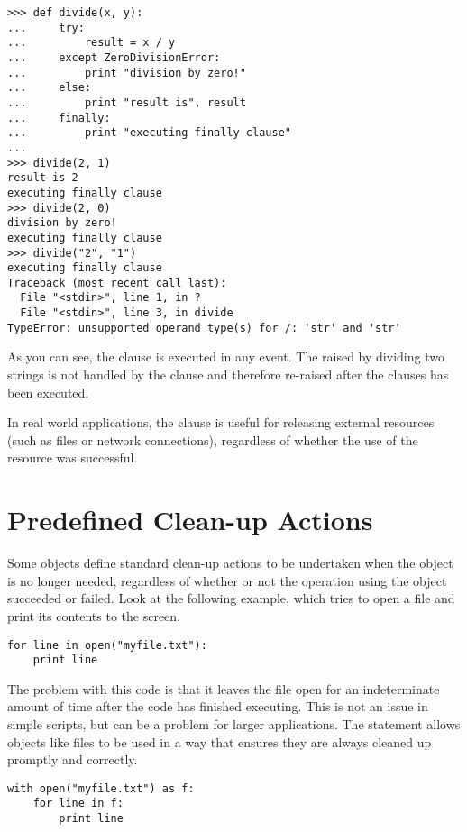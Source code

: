 \documentclass{manual}
\begin{document}
\begin{verbatim}
>>> def divide(x, y):
...     try:
...         result = x / y
...     except ZeroDivisionError:
...         print "division by zero!"
...     else:
...         print "result is", result
...     finally:
...         print "executing finally clause"
...
>>> divide(2, 1)
result is 2
executing finally clause
>>> divide(2, 0)
division by zero!
executing finally clause
>>> divide("2", "1")
executing finally clause
Traceback (most recent call last):
  File "<stdin>", line 1, in ?
  File "<stdin>", line 3, in divide
TypeError: unsupported operand type(s) for /: 'str' and 'str'
\end{verbatim}

As you can see, the  clause is executed in any
event.  The  raised by dividing two strings
is not handled by the  clause and therefore
re-raised after the  clauses has been executed.

In real world applications, the  clause is useful
for releasing external resources (such as files or network connections),
regardless of whether the use of the resource was successful.

\section{Predefined Clean-up Actions \label{cleanup-with}}

Some objects define standard clean-up actions to be undertaken when
the object is no longer needed, regardless of whether or not the
operation using the object succeeded or failed.
Look at the following example, which tries to open a file and print
its contents to the screen.

\begin{verbatim}
for line in open("myfile.txt"):
    print line
\end{verbatim}

The problem with this code is that it leaves the file open for an
indeterminate amount of time after the code has finished executing.
This is not an issue in simple scripts, but can be a problem for
larger applications. The  statement allows
objects like files to be used in a way that ensures they are
always cleaned up promptly and correctly.

\begin{verbatim}
with open("myfile.txt") as f:
    for line in f:
        print line
\end{verbatim}
\end{document}
